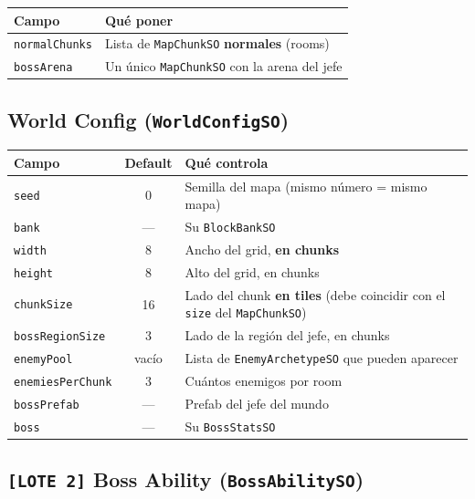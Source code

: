 \documentclass[a4paper,12pt]{article}
\newcommand{\code}[1]{\texttt{#1}}
\begin{document}
\begin{center}
\begin{tabular}{|l|p{9cm}|}
\hline
\textbf{Campo} & \textbf{Qué poner} \\
\hline
\code{normalChunks} & Lista de \code{MapChunkSO} \textbf{normales} (rooms) \\
\hline
\code{bossArena} & Un único \code{MapChunkSO} con la arena del jefe \\
\hline
\end{tabular}
\end{center}

\subsection{World Config (\code{WorldConfigSO})}

\begin{center}
\begin{longtable}{|l|c|p{6.2cm}|}
\hline
\textbf{Campo} & \textbf{Default} & \textbf{Qué controla} \\
\hline
\endhead
\code{seed} & 0 & Semilla del mapa (mismo número = mismo mapa) \\
\hline
\code{bank} & --- & Su \code{BlockBankSO} \\
\hline
\code{width} & 8 & Ancho del grid, \textbf{en chunks} \\
\hline
\code{height} & 8 & Alto del grid, en chunks \\
\hline
\code{chunkSize} & 16 & Lado del chunk \textbf{en tiles} (debe coincidir con el \code{size} del \code{MapChunkSO}) \\
\hline
\code{bossRegionSize} & 3 & Lado de la región del jefe, en chunks \\
\hline
\code{enemyPool} & vacío & Lista de \code{EnemyArchetypeSO} que pueden aparecer \\
\hline
\code{enemiesPerChunk} & 3 & Cuántos enemigos por room \\
\hline
\code{bossPrefab} & --- & Prefab del jefe del mundo \\
\hline
\code{boss} & --- & Su \code{BossStatsSO} \\
\hline
\end{longtable}
\end{center}

\subsection{\code{[LOTE 2]} Boss Ability (\code{BossAbilitySO})}
\end{document}
